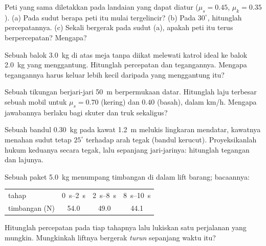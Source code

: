 \begin{exercise}[$\star\star$]\label{exo:g12:newtons-laws:7}
Peti yang sama diletakkan pada landaian yang dapat diatur ($\mu_s = 0.45$,
$\mu_k = 0.35$). (a) Pada sudut berapa peti itu mulai tergelincir? (b) Pada
$30^\circ$, hitunglah percepatannya. (c) Sekali bergerak pada sudut (a), apakah peti
itu terus berpercepatan? Mengapa?
\end{exercise}

\begin{exercise}[$\star\star$]\label{exo:g12:newtons-laws:8}
Sebuah balok \qty{3.0}{kg} di atas meja tanpa  diikat melewati katrol ideal ke
balok \qty{2.0}{kg} yang menggantung. Hitunglah percepatan dan tegangannya. Mengapa
tegangannya harus keluar lebih kecil daripada  yang menggantung itu?
\end{exercise}

\begin{exercise}[$\star\star$]\label{exo:g12:newtons-laws:9}
Sebuah tikungan berjari-jari \qty{50}{m} berpermukaan datar. Hitunglah laju terbesar
sebuah mobil untuk $\mu_s = 0.70$ (kering) dan $0.40$ (basah), dalam \unit{km/h}.
Mengapa jawabannya berlaku bagi skuter dan truk sekaligus?
\end{exercise}

\begin{exercise}[$\star\star$]\label{exo:g12:newtons-laws:10}
Sebuah bandul \qty{0.30}{kg} pada kawat \qty{1.2}{m} melukis lingkaran mendatar,
kawatnya menahan sudut tetap $25^\circ$ terhadap arah tegak (bandul kerucut).
Proyeksikanlah hukum keduanya secara tegak, lalu sepanjang jari-jarinya: hitunglah
tegangan dan lajunya.
\end{exercise}

\begin{exercise}[$\star\star$]\label{exo:g12:newtons-laws:11}
Sebuah paket \qty{5.0}{kg} menumpang timbangan di dalam lift barang; bacaannya:
\begin{center}\small\begin{tabular}{lccc}
tahap & \qtyrange{0}{2}{s} & \qtyrange{2}{8}{s} & \qtyrange{8}{10}{s}\\
timbangan (\unit{N}) & 54.0 & 49.0 & 44.1
\end{tabular}\end{center}
Hitunglah percepatan pada tiap tahapnya lalu lukiskan satu perjalanan yang mungkin.
Mungkinkah liftnya bergerak \emph{turun} sepanjang waktu itu?
\end{exercise}

